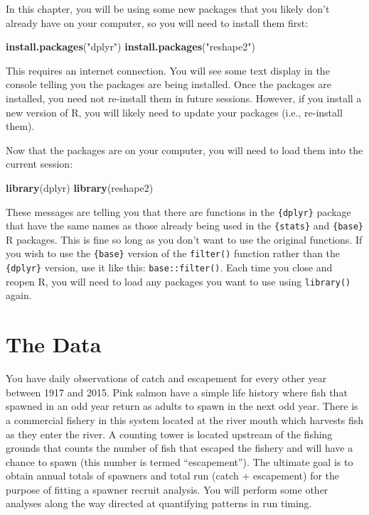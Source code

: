 \documentclass[]{book}
\newenvironment{Shaded}{\begin{snugshade}}{\end{snugshade}}
\newcommand{\KeywordTok}[1]{\textcolor[rgb]{0.13,0.29,0.53}{\textbf{#1}}}
\newcommand{\NormalTok}[1]{#1}
\newcommand{\StringTok}[1]{\textcolor[rgb]{0.31,0.60,0.02}{#1}}
\begin{document}
In this chapter, you will be using some new packages that you likely don't already have on your computer, so you will need to install them first:

\begin{Shaded}
\begin{Highlighting}[]
\KeywordTok{install.packages}\NormalTok{(}\StringTok{"dplyr"}\NormalTok{)}
\KeywordTok{install.packages}\NormalTok{(}\StringTok{"reshape2"}\NormalTok{)}
\end{Highlighting}
\end{Shaded}

This requires an internet connection. You will see some text display in the console telling you the packages are being installed. Once the packages are installed, you need not re-install them in future sessions. However, if you install a new version of R, you will likely need to update your packages (i.e., re-install them).

Now that the packages are on your computer, you will need to load them into the current session:

\begin{Shaded}
\begin{Highlighting}[]
\KeywordTok{library}\NormalTok{(dplyr)}
\KeywordTok{library}\NormalTok{(reshape2)}
\end{Highlighting}
\end{Shaded}

These messages are telling you that there are functions in the \texttt{\{dplyr\}} package that have the same names as those already being used in the \texttt{\{stats\}} and \texttt{\{base\}} R packages. This is fine so long as you don't want to use the original functions. If you wish to use the \texttt{\{base\}} version of the \texttt{filter()} function rather than the \texttt{\{dplyr\}} version, use it like this: \texttt{base::filter()}. Each time you close and reopen R, you will need to load any packages you want to use using \texttt{library()} again.

\hypertarget{the-data}{%
\section{The Data}\label{the-data}}

You have daily observations of catch and escapement for every other year between 1917 and 2015. Pink salmon have a simple life history where fish that spawned in an odd year return as adults to spawn in the next odd year. There is a commercial fishery in this system located at the river mouth which harvests fish as they enter the river. A counting tower is located upstream of the fishing grounds that counts the number of fish that escaped the fishery and will have a chance to spawn (this number is termed ``escapement''). The ultimate goal is to obtain annual totals of spawners and total run (catch + escapement) for the purpose of fitting a spawner recruit analysis. You will perform some other analyses along the way directed at quantifying patterns in run timing.
\end{document}
